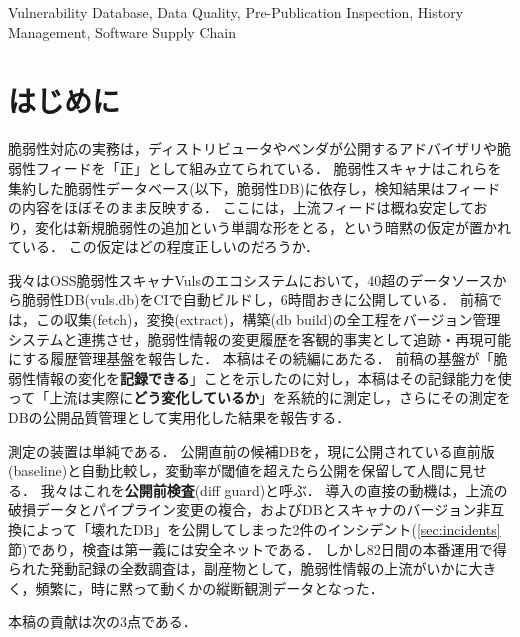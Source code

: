 \documentclass{css}
\begin{document}
\begin{ekeyword}
Vulnerability Database, Data Quality, Pre-Publication Inspection, History Management, Software Supply Chain
\end{ekeyword}

\maketitle

\section{はじめに}
\label{sec:intro}

脆弱性対応の実務は，ディストリビュータやベンダが公開するアドバイザリや脆弱性フィードを「正」として組み立てられている．
脆弱性スキャナはこれらを集約した脆弱性データベース(以下，脆弱性DB)に依存し，検知結果はフィードの内容をほぼそのまま反映する．
ここには，上流フィードは概ね安定しており，変化は新規脆弱性の追加という単調な形をとる，という暗黙の仮定が置かれている．
この仮定はどの程度正しいのだろうか．

我々はOSS脆弱性スキャナVuls\cite{vuls}のエコシステムにおいて，40超のデータソースから脆弱性DB(vuls.db)をCIで自動ビルドし，6時間おきに公開している．
前稿\cite{nakaoka2025}では，この収集(fetch)，変換(extract)，構築(db build)の全工程をバージョン管理システムと連携させ，脆弱性情報の変更履歴を客観的事実として追跡・再現可能にする履歴管理基盤を報告した．
本稿はその続編にあたる．
前稿の基盤が「脆弱性情報の変化を\textbf{記録できる}」ことを示したのに対し，本稿はその記録能力を使って「上流は実際に\textbf{どう変化しているか}」を系統的に測定し，さらにその測定をDBの公開品質管理として実用化した結果を報告する．

測定の装置は単純である．
公開直前の候補DBを，現に公開されている直前版(baseline)と自動比較し，変動率が閾値を超えたら公開を保留して人間に見せる．
我々はこれを\textbf{公開前検査}(diff guard)と呼ぶ．
導入の直接の動機は，上流の破損データとパイプライン変更の複合，およびDBとスキャナのバージョン非互換によって「壊れたDB」を公開してしまった2件のインシデント(\ref{sec:incidents}節)であり，検査は第一義には安全ネットである．
しかし82日間の本番運用で得られた発動記録の全数調査は，副産物として，脆弱性情報の上流がいかに大きく，頻繁に，時に黙って動くかの縦断観測データとなった．

本稿の貢献は次の3点である．
\end{document}
